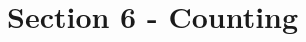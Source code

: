 \documentclass[../../Main.tex]{subfiles}
\begin{document}
\chapter{Section 6 - Counting}







\end{document}
